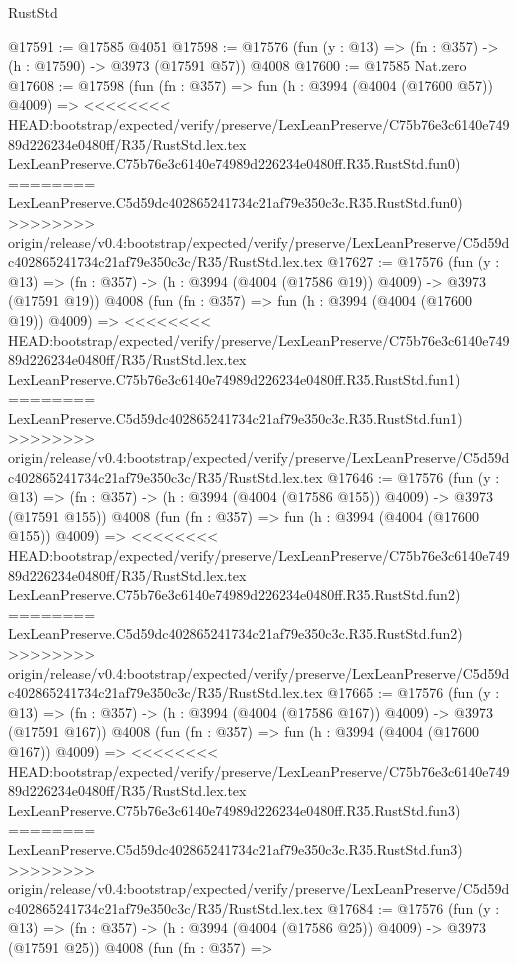 \begin{lexlean}{RustStd}
\begin{coremodule}
{\begin{coremodule}
{{{{{{{{{{{{{{{{@17591 := @17585 @4051
@17598 := @17576 (fun (y : @13) => (fn : @357) -> (h : @17590) -> @3973 (@17591 @57)) @4008
@17600 := @17585 Nat.zero
@17608 := @17598
    (fun (fn : @357) =>
    fun (h : @3994 (@4004 (@17600 @57)) @4009) =>
<<<<<<<< HEAD:bootstrap/expected/verify/preserve/LexLeanPreserve/C75b76e3c6140e74989d226234e0480ff/R35/RustStd.lex.tex
    LexLeanPreserve.C75b76e3c6140e74989d226234e0480ff.R35.RustStd.fun0)
========
    LexLeanPreserve.C5d59dc402865241734c21af79e350c3c.R35.RustStd.fun0)
>>>>>>>> origin/release/v0.4:bootstrap/expected/verify/preserve/LexLeanPreserve/C5d59dc402865241734c21af79e350c3c/R35/RustStd.lex.tex
@17627 := @17576
    (fun (y : @13) => (fn : @357) -> (h : @3994 (@4004 (@17586 @19)) @4009) -> @3973 (@17591 @19))
    @4008
    (fun (fn : @357) =>
    fun (h : @3994 (@4004 (@17600 @19)) @4009) =>
<<<<<<<< HEAD:bootstrap/expected/verify/preserve/LexLeanPreserve/C75b76e3c6140e74989d226234e0480ff/R35/RustStd.lex.tex
    LexLeanPreserve.C75b76e3c6140e74989d226234e0480ff.R35.RustStd.fun1)
========
    LexLeanPreserve.C5d59dc402865241734c21af79e350c3c.R35.RustStd.fun1)
>>>>>>>> origin/release/v0.4:bootstrap/expected/verify/preserve/LexLeanPreserve/C5d59dc402865241734c21af79e350c3c/R35/RustStd.lex.tex
@17646 := @17576
    (fun (y : @13) => (fn : @357) -> (h : @3994 (@4004 (@17586 @155)) @4009) -> @3973 (@17591 @155))
    @4008
    (fun (fn : @357) =>
    fun (h : @3994 (@4004 (@17600 @155)) @4009) =>
<<<<<<<< HEAD:bootstrap/expected/verify/preserve/LexLeanPreserve/C75b76e3c6140e74989d226234e0480ff/R35/RustStd.lex.tex
    LexLeanPreserve.C75b76e3c6140e74989d226234e0480ff.R35.RustStd.fun2)
========
    LexLeanPreserve.C5d59dc402865241734c21af79e350c3c.R35.RustStd.fun2)
>>>>>>>> origin/release/v0.4:bootstrap/expected/verify/preserve/LexLeanPreserve/C5d59dc402865241734c21af79e350c3c/R35/RustStd.lex.tex
@17665 := @17576
    (fun (y : @13) => (fn : @357) -> (h : @3994 (@4004 (@17586 @167)) @4009) -> @3973 (@17591 @167))
    @4008
    (fun (fn : @357) =>
    fun (h : @3994 (@4004 (@17600 @167)) @4009) =>
<<<<<<<< HEAD:bootstrap/expected/verify/preserve/LexLeanPreserve/C75b76e3c6140e74989d226234e0480ff/R35/RustStd.lex.tex
    LexLeanPreserve.C75b76e3c6140e74989d226234e0480ff.R35.RustStd.fun3)
========
    LexLeanPreserve.C5d59dc402865241734c21af79e350c3c.R35.RustStd.fun3)
>>>>>>>> origin/release/v0.4:bootstrap/expected/verify/preserve/LexLeanPreserve/C5d59dc402865241734c21af79e350c3c/R35/RustStd.lex.tex
@17684 := @17576
    (fun (y : @13) => (fn : @357) -> (h : @3994 (@4004 (@17586 @25)) @4009) -> @3973 (@17591 @25))
    @4008
    (fun (fn : @357) =>
}}}}}}}}}}}}}}}}
\end{coremodule}}
\end{coremodule}
\end{lexlean}
